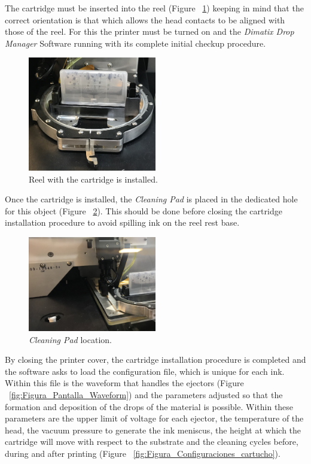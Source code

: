The cartridge must be inserted into the reel (Figure ~\ref{fig:Figura_Carrete1}) keeping in mind that the correct orientation is that which allows the head contacts to be aligned with those of the reel. For this the printer must be turned on and the \textit{Dimatix Drop Manager} Software running with its complete initial checkup procedure.

\begin{figure}[H]
  \centering
    \includegraphics[width=0.5\textwidth]{Figures/Figura_Carrete1}
  \caption{Reel with the cartridge is installed.}
  \label{fig:Figura_Carrete1}
\end{figure}

Once the cartridge is installed, the \textit{Cleaning Pad} is placed in the dedicated hole for this object (Figure ~\ref{fig:Figura_Orificio_Cleaning_Pad}). This should be done before closing the cartridge installation procedure to avoid spilling ink on the reel rest base.

\begin{figure}[H]
  \centering
    \includegraphics[width=0.5\textwidth]{Figures/Figura_Orificio_Cleaning_Pad}
  \caption{\textit{Cleaning Pad} location.}
  \label{fig:Figura_Orificio_Cleaning_Pad}
\end{figure}

By closing the printer cover, the cartridge installation procedure is completed and the software asks to load the configuration file, which is unique for each ink. Within this file is the waveform that handles the ejectors (Figure ~\ref{fig:Figura_Pantalla_Waveform}) and the parameters adjusted so that the formation and deposition of the drops of the material is possible. Within these parameters are the upper limit of voltage for each ejector, the temperature of the head, the vacuum pressure to generate the ink meniscus, the height at which the cartridge will move with respect to the substrate and the cleaning cycles before, during and after printing (Figure ~\ref{fig:Figura_Configuraciones_cartucho}).

